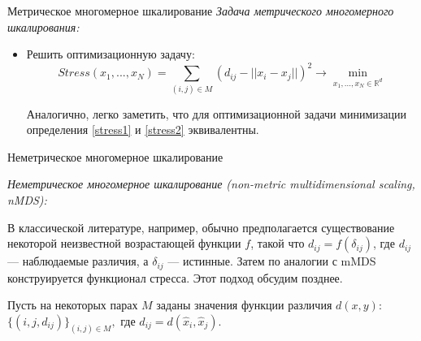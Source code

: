 \documentclass[9pt]{beamer}
\begin{document}
\begin{frame}{Метрическое многомерное шкалирование}
        \textit{Задача метрического многомерного шкалирования:}
    
    \begin{itemize}
        \item Решить оптимизационную задачу:
        \begin{equation}
        \label{stress_min}
        Stress(x_1, ..., x_N) = \sum_{(i, j) \in M} (d_{ij} - || x_i - x_j ||)^2 \longrightarrow \min_{x_1, ..., x_N \in \mathbb{R}^d}
        \end{equation}
        
        \vspace{\baselineskip}
        Аналогично, легко заметить, что для оптимизационной задачи минимизации определения \ref{stress1} и \ref{stress2} эквивалентны.
        
    \end{itemize}
\end{frame}

\begin{frame}{Неметрическое многомерное шкалирование}

\textit{Неметрическое многомерное шкалирование (non-metric multidimensional scaling, nMDS):}

\vspace{\baselineskip}
    
    В классической литературе, например, обычно предполагается существование некоторой неизвестной возрастающей функции $f$, такой что $d_{ij} = f(\delta_{ij})$, где $d_{ij}$ --- наблюдаемые различия, а $\delta_{ij}$  --- истинные. Затем по аналогии с mMDS конструируется функционал стресса. Этот подход обсудим позднее.
  \vspace{\baselineskip}  
  
    Пусть на некоторых парах $M$ заданы значения функции различия $d(x, y)$: $\{(i, j, d_{ij})\}_{(i, j) \in M},$ где $d_{ij} = d(\hat{x}_i, \hat{x}_j)$.
    
\end{frame}
\end{document}
